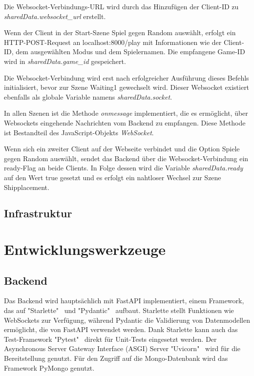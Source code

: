 \documentclass[a4paper, 10pt, conference]{IEEEtran}
\begin{document}
Die Websocket-Verbindungs-URL wird durch das Hinzufügen der Client-ID zu \textit{sharedData.websocket\_url} erstellt.

Wenn der Client in der Start-Szene \glqq Spiel gegen Random\grqq{} auswählt, erfolgt ein HTTP-POST-Request an \glqq localhost:8000/play\grqq{} mit Informationen wie der Client-ID, dem ausgewählten Modus und dem Spielernamen. Die empfangene Game-ID wird in \textit{sharedData.game\_id} gespeichert.

Die Websocket-Verbindung wird erst nach erfolgreicher Ausführung dieses Befehls initialisiert, bevor zur Szene \glqq Waiting1\grqq{} gewechselt wird. Dieser Websocket existiert ebenfalls als globale Variable namens \textit{sharedData.socket}.

In allen Szenen ist die Methode \textit{onmessage} implementiert, die es ermöglicht, über Websockets eingehende Nachrichten vom Backend zu empfangen. Diese Methode ist Bestandteil des JavaScript-Objekts \textit{WebSocket}.

Wenn sich ein zweiter Client auf der Webseite verbindet und die Option \glqq Spiele gegen Random\grqq{} auswählt, sendet das Backend über die Websocket-Verbindung ein \glqq ready\grqq{}-Flag an beide Clients. In Folge dessen wird die Variable \textit{sharedData.ready} auf den Wert \glqq true\grqq{} gesetzt und es erfolgt ein nahtloser Wechsel zur Szene \glqq Shipplacement\grqq{}.





\subsection{Infrastruktur}\label{subsec:infrastruktur}





\section{Entwicklungswerkzeuge}\label{sec:entwicklungswerkzeuge}



\subsection{Backend}\label{subsec:backend-dev-tools}
Das Backend wird hauptsächlich mit FastAPI implementiert, einem Framework, das auf "Starlette"~\cite{starlette} und "Pydantic"~\cite{pydantic} aufbaut. Starlette stellt Funktionen wie WebSockets zur Verfügung, während Pydantic die Validierung von Datenmodellen ermöglicht, die von FastAPI verwendet werden. Dank Starlette kann auch das Test-Framework "Pytest"~\cite{pytest} direkt für Unit-Tests eingesetzt werden. Der Asynchronous Server Gateway Interface (ASGI) Server "Uvicorn"~\cite{unvicorn} wird für die Bereitstellung genutzt.
Für den Zugriff auf die Mongo-Datenbank wird das Framework PyMongo genutzt. 
\end{document}
